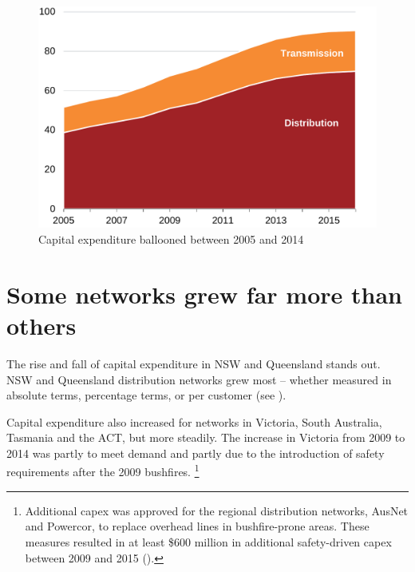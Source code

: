 \documentclass[FrontPage]{grattan}
\begin{document}
\begin{figure}
\caption{Capital expenditure ballooned between 2005 and 2014}\label{fig:capex-by-state-over-time}
\includegraphics[page=33]{atlas/Charts.pdf}
\end{figure}


\section{Some networks grew far more than others}\label{sec:some-networks-grew-more-than-others}

The rise and fall of capital expenditure in NSW and Queensland stands out. NSW and Queensland distribution networks grew most -- whether measured in absolute terms, percentage terms, or per customer (see ).

Capital expenditure also increased for networks in Victoria, South Australia, Tasmania and the ACT, but more steadily. The increase in Victoria from 2009 to 2014 was partly to meet demand and partly due to the introduction of safety requirements after the 2009 bushfires.%
\footnote{Additional capex was approved for the regional distribution networks, AusNet and Powercor, to replace overhead lines in bushfire-prone areas. These measures resulted in at least \$600 million in additional safety-driven capex between 2009 and 2015 (\textcite{AER2010VICDistributionFinalDetermination}).}
\end{document}
